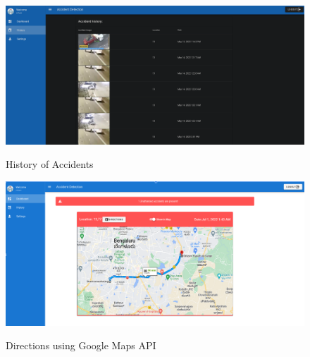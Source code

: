 \documentclass[ 12pt,a4paper,twocolumn,fleqn]{article}
\begin{document}
\begin{adjustwidth}{3.5em}{0pt}
\vspace*{\fill}
\begin{figure}[H]
\begin{center}
    \hspace*{0.4in}
    \includegraphics[scale=0.2]{media/ui2.png}
    \\
  \caption{ History of Accidents }
    
\end{center}
\end{figure}

\begin{figure}[H]
\begin{center}
    \hspace{0.2cm}
    
    \hspace*{0.4in}
    \includegraphics[scale=0.3]{media/maps.png}
    \\
  \caption{ Directions using Google Maps API}
\end{center}
\end{figure}
\vfill 

\newpage
  \pagestyle{fancy}


\end{adjustwidth}
\end{document}
